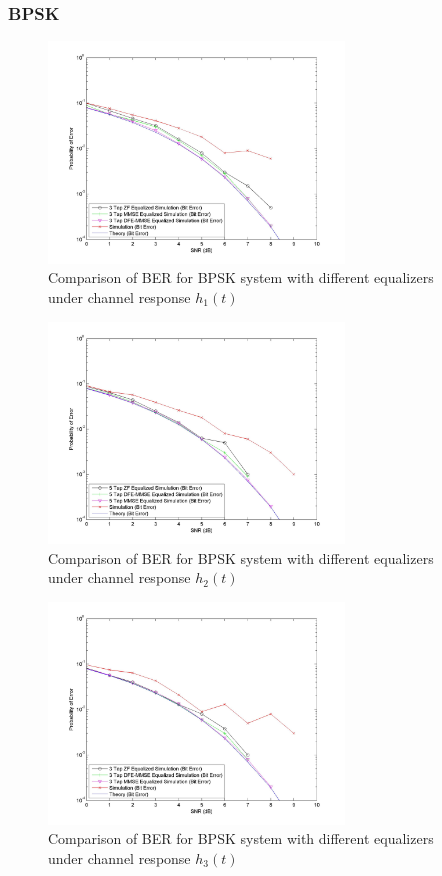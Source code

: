 \documentclass[]{article}
\begin{document}
\subsubsection{BPSK}

\begin{figure}[H]
\centering
\includegraphics[width=0.7\textwidth]{bpSNR1.jpg}
\caption{Comparison of BER for BPSK system with different equalizers under channel response $h_1(t)$}
\end{figure}

\begin{figure}[H]
\centering
\includegraphics[width=0.7\textwidth]{bpSNR2.jpg}
\caption{Comparison of BER for BPSK system with different equalizers under channel response $h_2(t)$}
\end{figure}

\begin{figure}[H]
\centering
\includegraphics[width=0.7\textwidth]{bpSNR3.jpg}
\caption{Comparison of BER for BPSK system with different equalizers under channel response $h_3(t)$}
\end{figure}
\end{document}
